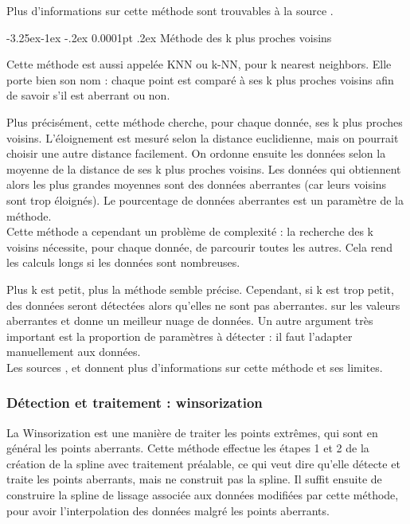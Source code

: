 \documentclass[a4paper,12pt]{article} %
\makeatletter
\renewcommand\paragraph{\@startsection{paragraph}{4}{\z@}%
                                      {-3.25ex\@plus -1ex \@minus -.2ex}%
                                      {0.0001pt \@plus .2ex}%
                                      {\normalfont\normalsize\bfseries}}
\makeatother
\begin{document}
                         Plus d'informations sur cette méthode sont trouvables à la source \cite{DES}.

				
					\paragraph{Méthode des k plus proches voisins}
					
					    Cette méthode est aussi appelée KNN ou k-NN, pour k nearest neighbors. Elle porte bien son nom : chaque point est comparé à ses k plus proches voisins afin de savoir s'il est aberrant ou non.
    					
    					Plus précisément, cette méthode cherche, pour chaque donnée, ses k plus proches voisins. L'éloignement est mesuré selon la distance euclidienne, mais on pourrait choisir une autre distance facilement.
    					On ordonne ensuite les données selon la moyenne de la distance de ses k plus proches voisins. Les données qui obtiennent alors les plus grandes moyennes sont des données aberrantes (car leurs voisins sont trop éloignés). Le pourcentage de données aberrantes est un paramètre de la méthode.\\
    					
    					Cette méthode a cependant un problème de complexité : la recherche des k voisins nécessite, pour chaque donnée, de parcourir toutes les autres. Cela rend les calculs longs si les données sont nombreuses.
                        
                        Plus k est petit, plus la méthode semble précise. Cependant, si k est trop petit, des données seront détectées alors qu'elles ne sont pas aberrantes. sur les valeurs aberrantes et donne un meilleur nuage de données. Un autre argument très important est la proportion de paramètres à détecter : il faut l'adapter manuellement aux données.\\
                        
                        Les sources \cite{KNN1}, \cite{KNN2} et \cite{KNN3} donnent plus d'informations sur cette méthode et ses limites.

                
			\subsubsection{Détection et traitement : winsorization}
				    La Winsorization est une manière de traiter les points extrêmes, qui sont en général les points aberrants. Cette méthode effectue les étapes 1 et 2 de la création de la spline avec traitement préalable, ce qui veut dire qu'elle détecte et traite les points aberrants, mais ne construit pas la spline. Il suffit ensuite de construire la spline de lissage associée aux données modifiées par cette méthode, pour avoir l'interpolation des données malgré les points aberrants.\\
				    
\end{document}
